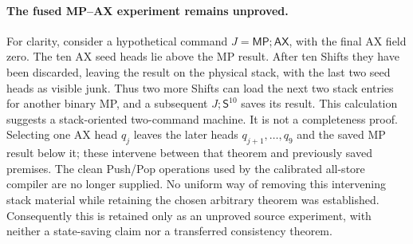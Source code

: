 \paragraph{The fused MP--AX experiment remains unproved.}
For clarity, consider a hypothetical command $J=\mathsf{MP};\mathsf{AX}$,
with the final AX field zero.  The ten AX seed heads lie above the MP
result.  After ten Shifts they have been discarded, leaving the result
on the physical stack, with the last two seed heads as visible junk.
Thus two more Shifts can load the next two stack entries for another
binary MP, and a subsequent $J;\mathsf S^{10}$ saves its result.
This calculation suggests a stack-oriented two-command machine.
It is not a completeness proof.  Selecting one AX head $q_j$ leaves the
later heads $q_{j+1},\ldots,q_9$ and the saved MP result below it; these
intervene between that theorem and previously saved premises.  The clean
Push/Pop operations used by the calibrated all-store compiler are no
longer supplied.  No uniform way of removing this intervening stack
material while retaining the chosen arbitrary theorem was established.
Consequently this is retained only as an unproved source experiment,
with neither a state-saving claim nor a transferred consistency theorem.
